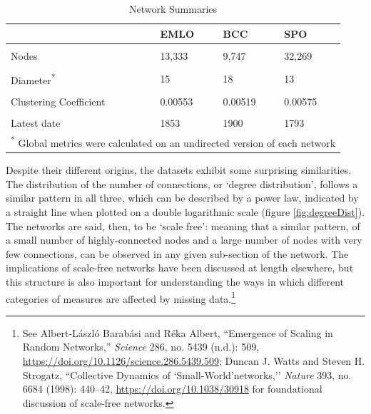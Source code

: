 \documentclass[]{article}
\begin{document}
\begin{table}

\caption{\label{tab:networkTable}Network Summaries}
\centering
\begin{tabular}[t]{llll}
\toprule
  & EMLO & BCC & SPO\\
\midrule
\cellcolor{gray!6}{Letter Records} & \cellcolor{gray!6}{100,277} & \cellcolor{gray!6}{54,620} & \cellcolor{gray!6}{174,278}\\
Nodes & 13,333 & 9,747 & 32,269\\
\cellcolor{gray!6}{Unique Edges} & \cellcolor{gray!6}{21,678} & \cellcolor{gray!6}{12,705} & \cellcolor{gray!6}{56,850}\\
Diameter\textsuperscript{*} & 15 & 18 & 13\\
\cellcolor{gray!6}{Avg path length} & \cellcolor{gray!6}{4.38} & \cellcolor{gray!6}{5.55} & \cellcolor{gray!6}{4.02}\\
\addlinespace
Clustering Coefficient & 0.00553 & 0.00519 & 0.00575\\
\cellcolor{gray!6}{Earliest date} & \cellcolor{gray!6}{1502} & \cellcolor{gray!6}{1508} & \cellcolor{gray!6}{1485}\\
Latest date & 1853 & 1900 & 1793\\
\bottomrule
\multicolumn{4}{l}{\rule{0pt}{1em}\textsuperscript{*} Global metrics were calculated on an undirected version of each network}\\
\end{tabular}
\end{table}

Despite their different origins, the datasets exhibit some surprising similarities. The distribution of the number of connections, or `degree distribution', follows a similar pattern in all three, which can be described by a power law, indicated by a straight line when plotted on a double logarithmic scale (figure \ref{fig:degreeDist}). The networks are said, then, to be `scale free': meaning that a similar pattern, of a small number of highly-connected nodes and a large number of nodes with very few connections, can be observed in any given sub-section of the network. The implications of scale-free networks have been discussed at length elsewhere, but this structure is also important for understanding the ways in which different categories of measures are affected by missing data.\footnote{See Albert-László Barabási and Réka Albert, ``Emergence of Scaling in Random Networks,'' \emph{Science} 286, no. 5439 (n.d.): 509, \url{https://doi.org/10.1126/science.286.5439.509}; Duncan J. Watts and Steven H. Strogatz, ``Collective Dynamics of `Small-World'networks,'' \emph{Nature} 393, no. 6684 (1998): 440--42, \url{https://doi.org/10.1038/30918} for foundational discussion of scale-free networks.}
\end{document}
